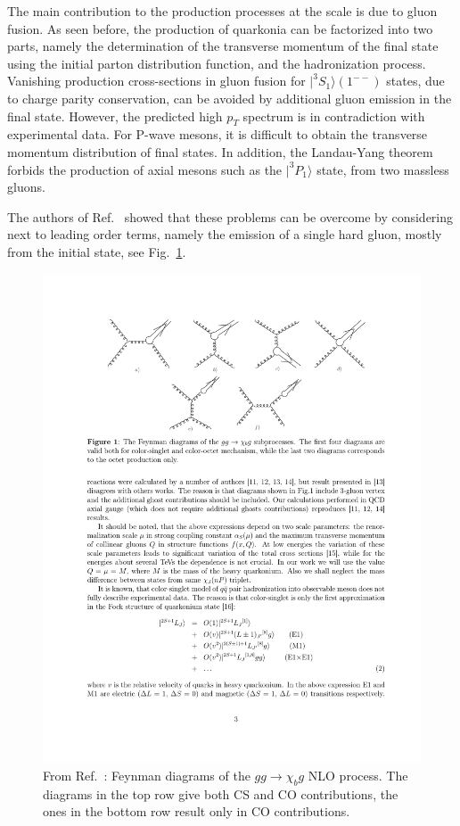 The main contribution to the production processes at the \tev scale is due to
gluon fusion. As seen before, the production of quarkonia can be factorized
into two parts, namely the determination of the transverse momentum of the
final state using the initial parton distribution function, and the
hadronization process. Vanishing production cross-sections in gluon fusion for
$|^3 S_1\rangle (1^{--})$ states, due to charge parity conservation, can be avoided
by additional gluon emission in the final state. However, the predicted high
$p_T$ spectrum is in contradiction with experimental data. For P-wave mesons,
it is difficult to obtain the transverse momentum distribution of final states.
In addition, the Landau-Yang theorem forbids the production of axial mesons
such as the $|^3P_1\rangle$ state, from two massless gluons.

The authors of Ref.~\cite{Likhoded:2012hw} showed that these problems can be overcome
by considering next to leading order terms, namely the emission of a single
hard gluon, mostly from the initial state, see Fig.~\ref{fig:chibprod_fig1}.

\begin{figure}
\center
\includegraphics[width=.75\textwidth]{figs/review/chibprod_fig1}
\caption{From Ref.~\cite{Likhoded:2012hw}: Feynman diagrams of the $gg\rightarrow \chi_b g$ NLO 
process. The diagrams in the top row give both CS and CO contributions, the ones in the 
bottom row result only in CO contributions.}
\label{fig:chibprod_fig1} 
\end{figure} 

